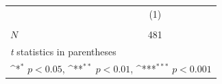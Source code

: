 {
\def\sym#1{\ifmmode^{#1}\else\(^{#1}\)\fi}
\begin{tabular}{l*{1}{c}}
\hline\hline
            &\multicolumn{1}{c}{(1)}\\
            &\multicolumn{1}{c}{} \\
\hline
\hline
\(N\)       &         481         \\
\hline\hline
\multicolumn{2}{l}{\footnotesize \textit{t} statistics in parentheses}\\
\multicolumn{2}{l}{\footnotesize \sym{*} \(p<0.05\), \sym{**} \(p<0.01\), \sym{***} \(p<0.001\)}\\
\end{tabular}
}
